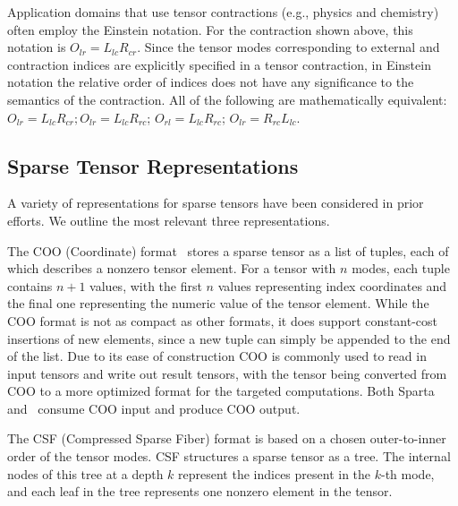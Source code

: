 Application domains that use tensor contractions (e.g., physics and chemistry) often employ the Einstein notation.
For the contraction shown above, this notation is $O_{lr} = L_{lc}R_{cr}$. Since the tensor modes corresponding to external and contraction indices are explicitly specified in a tensor contraction, in Einstein notation the relative order of indices 
does not have any significance to the semantics of the contraction. All of the following are mathematically equivalent: $O_{lr} = L_{lc}R_{cr}; O_{lr} = L_{lc}R_{rc}$; $O_{rl} = L_{lc}R_{rc}$; $O_{lr} = R_{rc}L_{lc}$. %


\subsection{Sparse Tensor Representations}

A variety of representations for sparse tensors have been considered in prior efforts. We outline the most relevant three representations. 

The COO (Coordinate) format~\cite{tewarson1973sparse} stores a sparse tensor as a list of tuples, each of which 
describes a nonzero tensor element. For a tensor with $n$ modes, each tuple contains $n+1$ values, with the first $n$ values representing index coordinates
and the final one representing the numeric value of the tensor element. While the COO format is not as compact as other formats, it does support constant-cost insertions of new elements, since a new tuple can simply be appended to the end of the list. Due to its ease of construction COO is commonly used to read in input tensors and write out result tensors, with the tensor being converted from COO to a more optimized format for the targeted computations. Both Sparta \cite{liu2021sparta} and \ourtool\ consume COO input and produce COO output.

The CSF (Compressed Sparse Fiber) format \cite{smith-csf} is based on a chosen outer-to-inner order of the tensor modes. CSF structures a sparse tensor as a tree. The internal nodes of this tree at a depth $k$ represent the indices present in the $k$-th mode, and each leaf in the tree represents one nonzero element in the tensor.

